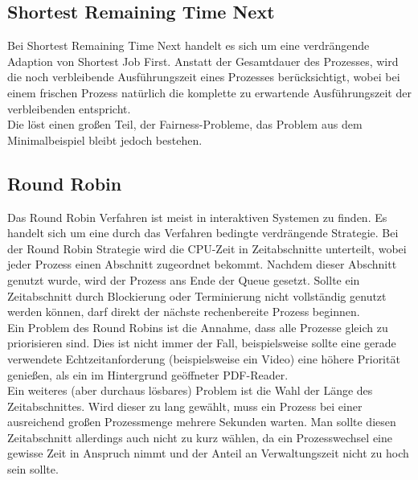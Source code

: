 \subsection{Shortest Remaining Time Next}
Bei Shortest Remaining Time Next handelt es sich um eine verdrängende Adaption von Shortest Job First.  
Anstatt der Gesamtdauer des Prozesses, wird die noch verbleibende Ausführungszeit eines Prozesses berücksichtigt, wobei bei einem frischen Prozess natürlich die komplette zu erwartende Ausführungszeit der verbleibenden entspricht. \\
Die löst einen großen Teil, der Fairness-Probleme, das Problem aus dem Minimalbeispiel bleibt jedoch bestehen. 

\subsection{Round Robin}
Das Round Robin Verfahren ist meist in interaktiven Systemen zu finden. Es handelt sich um eine durch das Verfahren bedingte verdrängende Strategie. Bei der Round Robin Strategie wird die CPU-Zeit in Zeitabschnitte unterteilt, wobei jeder Prozess einen Abschnitt zugeordnet bekommt. Nachdem dieser Abschnitt genutzt wurde, wird der Prozess ans Ende der Queue gesetzt. Sollte ein Zeitabschnitt durch Blockierung oder Terminierung nicht vollständig genutzt werden können, darf direkt der nächste rechenbereite Prozess beginnen. \\
Ein Problem des Round Robins ist die Annahme, dass alle Prozesse gleich zu priorisieren sind. Dies ist nicht immer der Fall, beispielsweise sollte eine gerade verwendete Echtzeitanforderung (beispielsweise ein Video) eine höhere Priorität genießen, als ein im Hintergrund geöffneter PDF-Reader. \\
Ein weiteres (aber durchaus lösbares) Problem ist die Wahl der Länge des Zeitabschnittes. Wird dieser zu lang gewählt, muss ein Prozess bei einer ausreichend großen Prozessmenge mehrere Sekunden warten. Man sollte diesen Zeitabschnitt allerdings auch nicht zu kurz wählen, da ein Prozesswechsel eine gewisse Zeit in Anspruch nimmt und der Anteil an Verwaltungszeit nicht zu hoch sein sollte.

